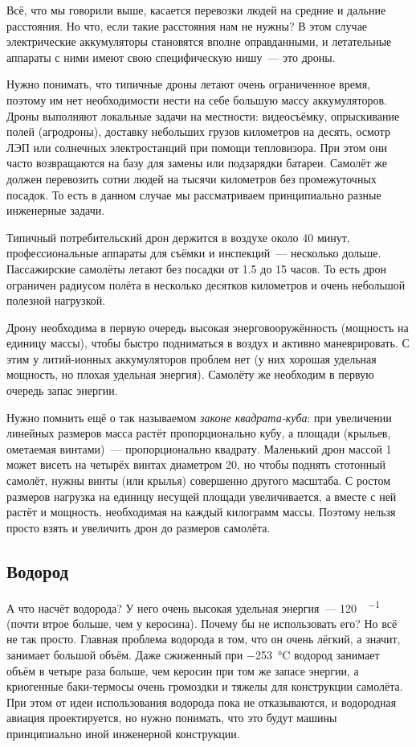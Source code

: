 Всё, что мы говорили выше, касается перевозки людей на средние и дальние расстояния. Но что, если такие расстояния нам не нужны? В этом случае электрические аккумуляторы становятся вполне оправданными, и летательные аппараты с ними имеют свою специфическую нишу~--- это дроны.

Нужно понимать, что типичные дроны летают очень ограниченное время, поэтому им нет необходимости нести на себе большую массу аккумуляторов. Дроны выполняют локальные задачи на местности: видеосъёмку, опрыскивание полей (агродроны), доставку небольших грузов километров на десять, осмотр ЛЭП или солнечных электростанций при помощи тепловизора. При этом они часто возвращаются на базу для замены или подзарядки батареи. Самолёт же должен перевозить сотни людей на тысячи километров без промежуточных посадок. То есть в данном случае мы рассматриваем принципиально разные инженерные задачи.

Типичный потребительский дрон держится в воздухе около \num{40} минут, профессиональные аппараты для съёмки и инспекций~--- несколько дольше. Пассажирские самолёты летают без посадки от \num{1,5} до \num{15} часов. То есть дрон ограничен радиусом полёта в несколько десятков километров и очень небольшой полезной нагрузкой.

Дрону необходима в первую очередь высокая энерговооружённость (мощность на единицу массы), чтобы быстро подниматься в воздух и активно маневрировать. С этим у литий-ионных аккумуляторов проблем нет (у них хорошая удельная мощность, но плохая удельная энергия). Самолёту же необходим в первую очередь запас энергии.

Нужно помнить ещё о так называемом \emph{законе квадрата-куба}: при увеличении линейных размеров масса растёт пропорционально кубу, а площади (крыльев, ометаемая винтами)~--- пропорционально квадрату. Маленький дрон массой \qty{1}{\ruKg} может висеть на четырёх винтах диаметром \qty{20}{\ruCm}, но чтобы поднять стотонный самолёт, нужны винты (или крылья) совершенно другого масштаба. С ростом размеров нагрузка на единицу несущей площади увеличивается, а вместе с ней растёт и мощность, необходимая на каждый килограмм массы. Поэтому нельзя просто взять и увеличить дрон до размеров самолёта.

\subsection*{Водород}

А что насчёт водорода? У него очень высокая удельная энергия~--- \qty{120}{\ruMJ\per\ruKg} (почти втрое больше, чем у керосина). Почему бы не использовать его? Но всё не так просто. Главная проблема водорода в том, что он очень лёгкий, а значит, занимает большой объём. Даже сжиженный при \qty{-253}{\degreeCelsius} водород занимает объём в четыре раза больше, чем керосин при том же запасе энергии, а криогенные баки-термосы очень громоздки и тяжелы для конструкции самолёта. При этом от идеи использования водорода пока не отказываются, и водородная авиация проектируется, но нужно понимать, что это будут машины принципиально иной инженерной конструкции.

